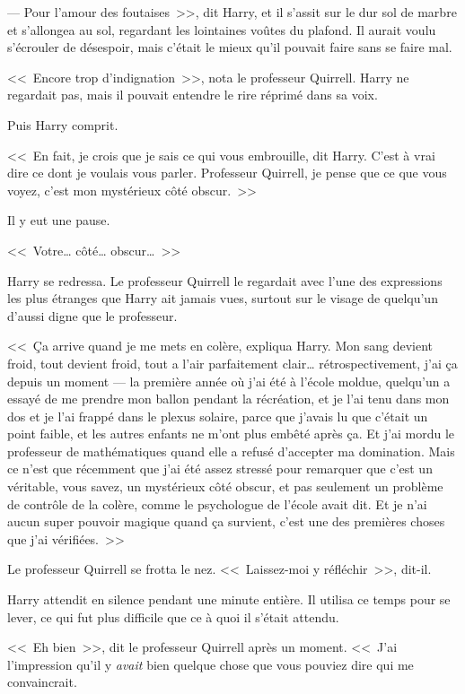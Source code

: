 --- Pour l'amour des foutaises~>>, dit Harry, et il s'assit sur le dur sol de marbre et s'allongea au sol, regardant les lointaines voûtes du plafond. Il aurait voulu s'écrouler de désespoir, mais c'était le mieux qu'il pouvait faire sans se faire mal.

<<~Encore trop d'indignation~>>, nota le professeur Quirrell. Harry ne regardait pas, mais il pouvait entendre le rire réprimé dans sa voix.

Puis Harry comprit.

<<~En fait, je crois que je sais ce qui vous embrouille, dit Harry. C'est à vrai dire ce dont je voulais vous parler. Professeur Quirrell, je pense que ce que vous voyez, c'est mon mystérieux côté obscur.~>>

Il y eut une pause.

<<~Votre… côté… obscur…~>>

Harry se redressa. Le professeur Quirrell le regardait avec l'une des expressions les plus étranges que Harry ait jamais vues, surtout sur le visage de quelqu'un d'aussi digne que le professeur.

<<~Ça arrive quand je me mets en colère, expliqua Harry. Mon sang devient froid, tout devient froid, tout a l'air parfaitement clair… rétrospectivement, j'ai ça depuis un moment — la première année où j'ai été à l'école moldue, quelqu'un a essayé de me prendre mon ballon pendant la récréation, et je l'ai tenu dans mon dos et je l'ai frappé dans le plexus solaire, parce que j'avais lu que c'était un point faible, et les autres enfants ne m'ont plus embêté après ça. Et j'ai mordu le professeur de mathématiques quand elle a refusé d'accepter ma domination. Mais ce n'est que récemment que j'ai été assez stressé pour remarquer que c'est un véritable, vous savez, un mystérieux côté obscur, et pas seulement un problème de contrôle de la colère, comme le psychologue de l'école avait dit. Et je n'ai aucun super pouvoir magique quand ça survient, c'est une des premières choses que j'ai vérifiées.~>>

Le professeur Quirrell se frotta le nez. <<~Laissez-moi y réfléchir~>>, dit-il.

Harry attendit en silence pendant une minute entière. Il utilisa ce temps pour se lever, ce qui fut plus difficile que ce à quoi il s'était attendu.

<<~Eh bien~>>, dit le professeur Quirrell après un moment. <<~J'ai l'impression qu'il y \emph{avait} bien quelque chose que vous pouviez dire qui me convaincrait.

